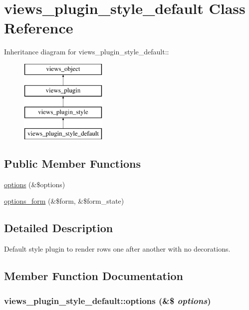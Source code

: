 \hypertarget{classviews__plugin__style__default}{
\section{views\_\-plugin\_\-style\_\-default Class Reference}
\label{classviews__plugin__style__default}
}
Inheritance diagram for views\_\-plugin\_\-style\_\-default::\begin{figure}[H]
\begin{center}
\leavevmode
\includegraphics[height=4cm]{classviews__plugin__style__default}
\end{center}
\end{figure}
\subsection*{Public Member Functions}
\begin{CompactItemize}
\item 
\hyperlink{classviews__plugin__style__default_db2765f7fde7c3d8cecaffa3ab660f79}{options} (\&\$options)
\item 
\hyperlink{classviews__plugin__style__default_6d6eb45c613c5990a44b3071cb82b36d}{options\_\-form} (\&\$form, \&\$form\_\-state)
\end{CompactItemize}


\subsection{Detailed Description}
Default style plugin to render rows one after another with no decorations. 

\subsection{Member Function Documentation}
\hypertarget{classviews__plugin__style__default_db2765f7fde7c3d8cecaffa3ab660f79}{
\subsubsection[{options}]{\setlength{\rightskip}{0pt plus 5cm}views\_\-plugin\_\-style\_\-default::options (\&\$ {\em options})}}
\label{classviews__plugin__style__default_db2765f7fde7c3d8cecaffa3ab660f79}


